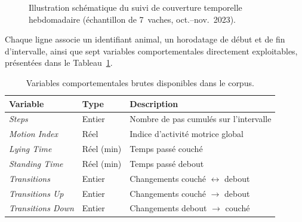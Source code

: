 \begin{figure}[H]
    \caption{Illustration schématique du suivi de couverture temporelle hebdomadaire
    (échantillon de 7~vaches, oct.--nov.~2023).}
    \label{fig:heatmap_couverture}
\end{figure}

Chaque ligne associe un identifiant animal, un horodatage de début et de fin d'intervalle,
ainsi que sept variables comportementales directement exploitables, présentées dans le
Tableau~\ref{tab:variables_brutes}.

\begin{table}[H]
    \centering
    \caption{Variables comportementales brutes disponibles dans le corpus.}
    \label{tab:variables_brutes}
    \begin{tabular}{lll}
        \toprule
        \textbf{Variable}     & \textbf{Type}   & \textbf{Description} \\
        \midrule
        \textit{Steps}                 & Entier          & Nombre de pas cumulés sur l'intervalle \\
        \textit{Motion Index}          & Réel            & Indice d'activité motrice global \\
        \textit{Lying Time}            & Réel (min)      & Temps passé couché \\
        \textit{Standing Time}         & Réel (min)      & Temps passé debout \\
        \textit{Transitions}           & Entier          & Changements couché $\leftrightarrow$ debout \\
        \textit{Transitions Up}        & Entier          & Changements couché $\rightarrow$ debout \\
        \textit{Transitions Down}      & Entier          & Changements debout $\rightarrow$ couché \\
        \bottomrule
    \end{tabular}
\end{table}

